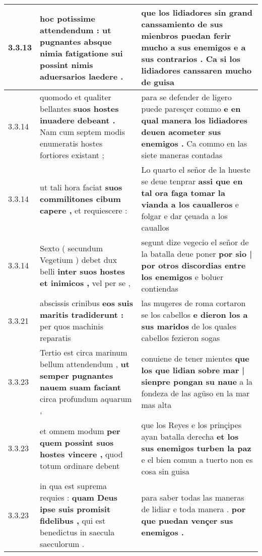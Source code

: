\begin{tabular}{|p{1cm}|p{6.5cm}|p{6.5cm}|}
3.3.13 & hoc potissime attendendum : \textbf{ ut pugnantes absque nimia fatigatione sui possint } nimis aduersarios laedere . & que los lidiadores \textbf{ sin grand canssamiento de sus mienbros puedan ferir mucho a sus enemigos e a sus contrarios . } Ca si los lidiadores canssaren mucho de guisa \\\hline
3.3.14 & quomodo et qualiter bellantes \textbf{ suos hostes inuadere debeant . } Nam cum septem modis enumeratis hostes fortiores existant ; & para se defender de ligero puede paresçer commo \textbf{ e en qual manera los lidiadores deuen acometer sus enemigos . } Ca commo en las siete maneras contadas \\\hline
3.3.14 & ut tali hora faciat \textbf{ suos commilitones cibum capere , } et requiescere : & Lo quarto el señor de la hueste se deue tenprar \textbf{ assi que en tal ora faga tomar la vianda a los caualleros } e folgar e dar çeuada a los cauallos \\\hline
3.3.14 & Sexto ( secundum Vegetium ) debet dux belli \textbf{ inter suos hostes et inimicos , } vel per se , & segunt dize vegecio el señor de la batalla deue poner \textbf{ por sio | por otros discordias entre los enemigos } e boluer contiendas \\\hline
3.3.21 & abscissis crinibus \textbf{ eos suis maritis tradiderunt : } per quos machinis reparatis & las mugeres de roma cortaron se los cabellos \textbf{ e dieron los a sus maridos } de los quales cabellos fezieron sogas \\\hline
3.3.23 & Tertio est circa marinum bellum attendendum , \textbf{ ut semper pugnantes nauem suam faciant } circa profundum aquarum , & conuiene de tener mientes \textbf{ que los que lidian sobre mar | sienpre pongan su naue } a la fondeza de las agüso en la mar mas alta \\\hline
3.3.23 & et omnem modum \textbf{ per quem possint suos hostes vincere , } quod totum ordinare debent & que los Reyes e los prinçipes ayan batalla derecha \textbf{ et los sus enemigos turben la paz } e el bien comun a tuerto non es cosa sin guisa \\\hline
3.3.23 & in qua est suprema requies : \textbf{ quam Deus ipse suis promisit fidelibus , } qui est benedictus in saecula saeculorum . & para saber todas las maneras de lidiar e toda manera . \textbf{ por que puedan vençer sus enemigos . }  \\\hline

\end{tabular}

